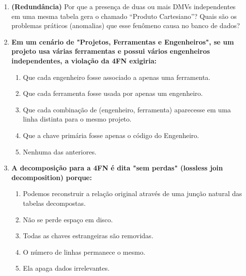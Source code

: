 \documentclass[12pt]{article}
\begin{document}
\begin{enumerate}[label=\textbf{Questão \arabic*:}, leftmargin=*]
  \vspace{0.4cm}

  \item \textbf{(Redundância)} Por que a presença de duas ou mais DMVs independentes em uma mesma tabela gera o chamado ``Produto Cartesiano''? Quais são os problemas práticos (anomalias) que esse fenômeno causa no banco de dados?
  
  \vspace{0.2cm}
  
  \begin{resposta}
  \end{resposta}
  
  \item \textbf{Em um cenário de "Projetos, Ferramentas e Engenheiros", se um projeto usa várias ferramentas e possui vários engenheiros independentes, a violação da 4FN exigiria:}
  \begin{enumerate}[label=\alph*)]
    \item Que cada engenheiro fosse associado a apenas uma ferramenta.
    \item Que cada ferramenta fosse usada por apenas um engenheiro.
    \item Que cada combinação de (engenheiro, ferramenta) aparecesse em uma linha distinta para o mesmo projeto.
    \item Que a chave primária fosse apenas o código do Engenheiro.
    \item Nenhuma das anteriores.
  \end{enumerate}

  \item \textbf{A decomposição para a 4FN é dita "sem perdas" (lossless join decomposition) porque:}
  \begin{enumerate}[label=\alph*)]
    \item Podemos reconstruir a relação original através de uma junção natural das tabelas decompostas.
    \item Não se perde espaço em disco.
    \item Todas as chaves estrangeiras são removidas.
    \item O número de linhas permanece o mesmo.
    \item Ela apaga dados irrelevantes.
  \end{enumerate}


\end{enumerate}
\end{document}

